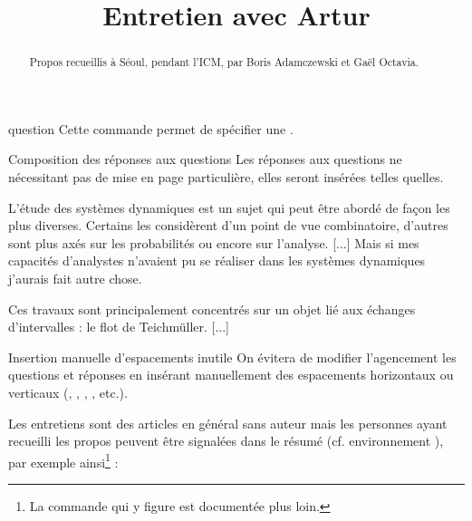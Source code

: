 \begin{docCommand}{question}{}
  Cette commande permet de spécifier une .
\end{docCommand}

\begin{dbremark}{Composition des réponses aux questions}{}
  Les réponses aux questions ne nécessitant pas de mise en page particulière,
  elles seront insérées telles quelles.
\end{dbremark}

\begin{bodycode}

L'étude des systèmes dynamiques est un sujet qui peut être abordé de façon les
plus diverses.  Certains les considèrent d'un point de vue combinatoire,
d'autres sont plus axés sur les probabilités ou encore sur l'analyse. [...]
Mais si mes capacités d'analystes n'avaient pu se réaliser dans les systèmes
dynamiques j'aurais fait autre chose.


Ces travaux sont principalement concentrés sur un objet lié aux échanges
d'intervalles : le flot de Teichmüller. [...]
\end{bodycode}

\begin{dbwarning}{Insertion manuelle d'espacements inutile}{}
  On évitera de modifier l'agencement les questions et réponses en insérant
  manuellement des espacements horizontaux ou verticaux (,
  , , , etc.).
\end{dbwarning}

Les entretiens sont des articles en général sans auteur mais les personnes ayant
recueilli les propos peuvent être signalées dans le résumé (cf. environnement
), par exemple ainsi\footnote{La commande  qui
  y figure est documentée plus loin.} :

\begin{bodycode}
\title{Entretien avec Artur }
\begin{abstract}
  Propos recueillis à Séoul, pendant l'ICM, par Boris Adamczewski et Gaël  Octavia.
\end{abstract}
\maketitle
\end{bodycode}

\iffalse
\fi
